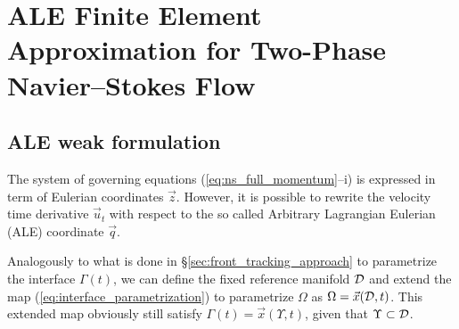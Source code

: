 \chapter[Two-Phase Navier--Stokes Flow ALE FEM]
{\sc ALE Finite Element Approximation for Two-Phase Navier--Stokes Flow}
\label{ch:ale}

\section{ALE weak formulation}\label{sec:ale_weak}
The system of governing equations (\ref{eq:ns_full_momentum}--i) is expressed in
term of Eulerian coordinates $\vec z$. However, it is possible to rewrite the
velocity time derivative $\vec u_t$ with respect to the so called Arbitrary
Lagrangian Eulerian (ALE) coordinate $\vec q$.

Analogously to what is done in \S\ref{sec:front_tracking_approach} to
parametrize the interface $\Gamma(t)$, we can define the fixed reference
manifold $\mathcal D$ and extend the map (\ref{eq:interface_parametrization}) to
parametrize $\Omega$ as $\Omega=\vec x(\mathcal D,t)$. This extended map obviously
still satisfy $\Gamma(t) = \vec x(\Upsilon,t)$, given that $\Upsilon\subset\mathcal D$.

